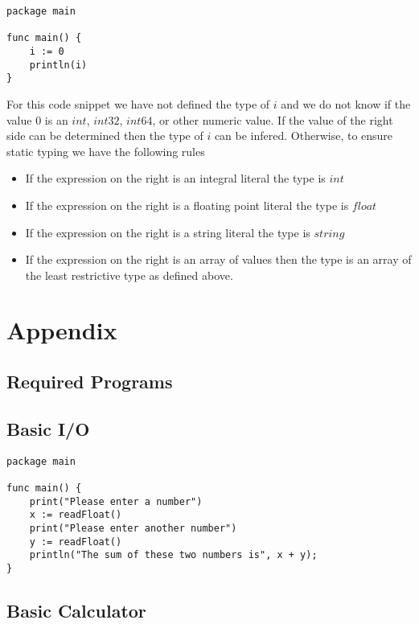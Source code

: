 \documentclass{article}
\begin{document}
\begin{lstlisting}[title=Untyped value]
package main

func main() {
    i := 0
    println(i)
}
\end{lstlisting}

For this code snippet we have not defined the type of $i$ and we do not know if the value 0 is an $int$, $int32$, $int64$, or other numeric value.
If the value of the right side can be determined then the type of $i$ can be infered.
Otherwise, to ensure static typing we have the following rules

\begin{itemize}
    \item   If the expression on the right is an integral literal the type is $int$
    \item   If the expression on the right is a floating point literal the type is $float$
    \item   If the expression on the right is a string literal the type is $string$
    \item   If the expression on the right is an array of values then the type is an array of the least restrictive type as defined above. 
\end{itemize}

\appendix

\section{Appendix}

\subsection{Required Programs}

\subsection{Basic I/O}

\begin{lstlisting}[title=Basic I/O Program]
package main

func main() {
    print("Please enter a number")
    x := readFloat()
    print("Please enter another number")
    y := readFloat()
    println("The sum of these two numbers is", x + y);
}
\end{lstlisting}

\subsection{Basic Calculator}
\end{document}
